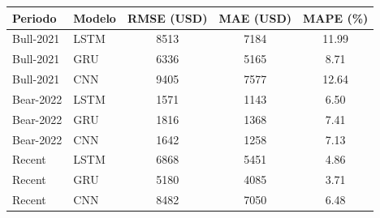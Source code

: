 \begin{tabular}{l|l|ccc}
\hline
\textbf{Periodo} & \textbf{Modelo} & \textbf{RMSE (USD)} & \textbf{MAE (USD)} & \textbf{MAPE (\%)} \\
\hline
Bull-2021 & LSTM & 8513 & 7184 & 11.99 \\
Bull-2021 & GRU & 6336 & 5165 & 8.71 \\
Bull-2021 & CNN & 9405 & 7577 & 12.64 \\
Bear-2022 & LSTM & 1571 & 1143 & 6.50 \\
Bear-2022 & GRU & 1816 & 1368 & 7.41 \\
Bear-2022 & CNN & 1642 & 1258 & 7.13 \\
Recent & LSTM & 6868 & 5451 & 4.86 \\
Recent & GRU & 5180 & 4085 & 3.71 \\
Recent & CNN & 8482 & 7050 & 6.48 \\
\hline
\end{tabular}
